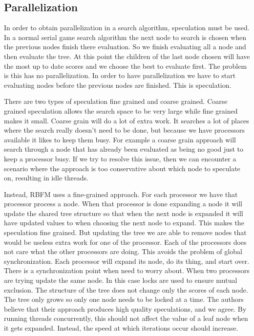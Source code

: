 \documentclass[conference]{IEEEtran}
\begin{document}
\subsection{Parallelization}
In order to obtain parallelization in a search algorithm, speculation must be used. In a normal serial game search algorithm the next node to search is chosen when the previous nodes finish there evaluation. So we finish evaluating all a node and then evaluate the tree.  At this point the children of the last node chosen will have the most up to date scores and we choose the best to evaluate first. The problem is this has no parallelization. In order to have parallelization we have to start evaluating nodes before the previous nodes are finished. This is speculation.\par
There are two types of speculation fine grained and coarse grained. Coarse grained speculation allows the search space to be very large while fine grained makes it small. Coarse grain will do a lot of extra work. It searches a lot of places where the search really doesn't need to be done, but because we have processors available it likes to keep them busy. For example a coarse grain approach will search through a node that has already been evaluated as being no good just to keep a processor busy. If we try to resolve this issue, then we can encounter a scenario where the approach is too conservative about which node to speculate on, resulting in idle threads.\par
Instead, RBFM uses a fine-grained approach. For each processor we have that processor process a node. When that processor is done expanding a node it will update the shared tree structure so that when the next node is expanded it will have updated values to when choosing the next node to expand. This makes the speculation fine grained. But updating the tree we are able to remove nodes that would be useless extra work for one of the processor. Each of the processors does not care what the other processors are doing. This avoids the problem of global synchronization. Each processor will expand its node, do its thing, and start over. There is a synchronization point when need to worry about.  When two processors are trying update the same node. In this case locks are used to ensure mutual exclusion. The structure of the tree does not change only the scores of each node. The tree only grows so only one node needs to be locked at a time. The authors believe that their approach produces high quality speculations, and we agree. By running threads concurrently, this should not affect the value of a leaf node when it gets expanded. Instead, the speed at which iterations occur should increase. 
\end{document}
